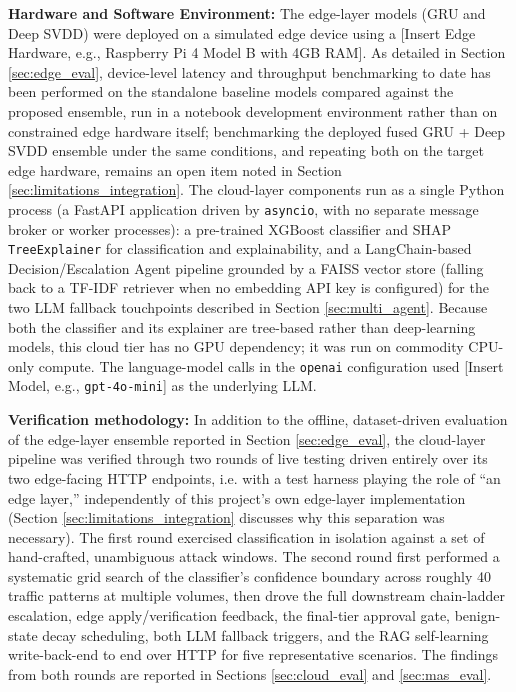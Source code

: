 \textbf{Hardware and Software Environment:} The edge-layer models (GRU and Deep SVDD) were deployed on a simulated edge device using a [Insert Edge Hardware, e.g., Raspberry Pi 4 Model B with 4GB RAM]. As detailed in Section \ref{sec:edge_eval}, device-level latency and throughput benchmarking to date has been performed on the standalone baseline models compared against the proposed ensemble, run in a notebook development environment rather than on constrained edge hardware itself; benchmarking the deployed fused GRU + Deep SVDD ensemble under the same conditions, and repeating both on the target edge hardware, remains an open item noted in Section \ref{sec:limitations_integration}. The cloud-layer components run as a single Python process (a FastAPI application driven by \texttt{asyncio}, with no separate message broker or worker processes): a pre-trained XGBoost classifier and SHAP \texttt{TreeExplainer} for classification and explainability, and a LangChain-based Decision/Escalation Agent pipeline grounded by a FAISS vector store (falling back to a TF-IDF retriever when no embedding API key is configured) for the two LLM fallback touchpoints described in Section \ref{sec:multi_agent}. Because both the classifier and its explainer are tree-based rather than deep-learning models, this cloud tier has no GPU dependency; it was run on commodity CPU-only compute. The language-model calls in the \texttt{openai} configuration used [Insert Model, e.g., \texttt{gpt-4o-mini}] as the underlying LLM.

\textbf{Verification methodology:} In addition to the offline, dataset-driven evaluation of the edge-layer ensemble reported in Section \ref{sec:edge_eval}, the cloud-layer pipeline was verified through two rounds of live testing driven entirely over its two edge-facing HTTP endpoints, i.e. with a test harness playing the role of ``an edge layer,'' independently of this project's own edge-layer implementation (Section \ref{sec:limitations_integration} discusses why this separation was necessary). The first round exercised classification in isolation against a set of hand-crafted, unambiguous attack windows. The second round first performed a systematic grid search of the classifier's confidence boundary across roughly 40 traffic patterns at multiple volumes, then drove the full downstream chain-ladder escalation, edge apply/verification feedback, the final-tier approval gate, benign-state decay scheduling, both LLM fallback triggers, and the RAG self-learning write-back-end to end over HTTP for five representative scenarios. The findings from both rounds are reported in Sections \ref{sec:cloud_eval} and \ref{sec:mas_eval}.


